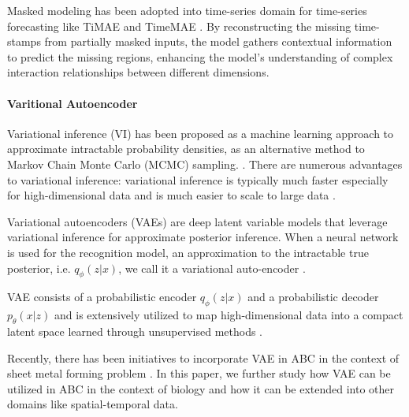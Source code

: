 \documentclass[12pt]{article} %
\newcommand{\para}[1]{\vspace*{-4.5mm}\paragraph{#1}}
\begin{document}
Masked modeling has been adopted into time-series domain for time-series forecasting like TiMAE and TimeMAE \citep{li2023ti}\citep{cheng2023timemae}. By reconstructing the missing time-stamps from partially masked inputs, the model gathers contextual information to predict the missing regions, enhancing the model's understanding of complex interaction relationships between different dimensions.

\para{Varitional Autoencoder}
Variational inference (VI) has been proposed as a machine learning approach to approximate intractable probability densities, as an alternative method to Markov Chain Monte Carlo (MCMC) sampling. \citep{jordan1999introduction}\citep{Blei_2017}. There are numerous advantages to variational inference: variational inference is typically much faster especially for high-dimensional data and is much easier to scale to large data \citep{Blei_2017}.

Variational autoencoders (VAEs) are deep latent variable models that leverage variational inference for approximate posterior inference. When a neural network is used for the recognition model, an approximation to the intractable true posterior, i.e. $q_{\phi}(z|x)$, we call it a variational auto-encoder \citep{kingma2013auto}. 

VAE consists of a probabilistic encoder $q_{\phi}(z|x)$ and a probabilistic decoder $p_{\theta}(x|z)$ and is extensively utilized to map high-dimensional data into a compact latent space learned through unsupervised methods \citep{girin2020dynamical}. 

Recently, there has been initiatives to incorporate VAE in ABC in the context of sheet metal forming problem \citep{wang2019variational}. In this paper, we further study how VAE can be utilized in ABC in the context of biology and how it can be extended into other domains like spatial-temporal data. 



\end{document}

